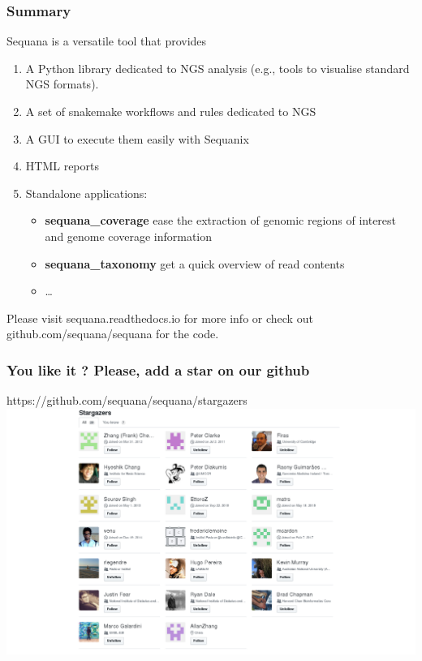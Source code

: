 \documentclass{beamer}
\begin{document}
\begin{frame}
 \frametitle{Summary}
Sequana is a versatile tool that provides

\begin{enumerate}
 \item A Python library dedicated to NGS analysis (e.g., tools to visualise 
standard NGS formats).
\item A set of snakemake workflows and rules dedicated to NGS 
 \item A GUI to execute them easily with Sequanix
 \item HTML reports
 \item Standalone applications:
 \begin{itemize}
    \item \textbf{sequana\_coverage} ease the extraction of genomic regions of interest and genome coverage information
    \item \textbf{sequana\_taxonomy} get a quick overview of read contents
    \item \dots
 \end{itemize}
\end{enumerate}

\begin{alertblock}{}
Please visit sequana.readthedocs.io for more info or check out
github.com/sequana/sequana  for the code.
\end{alertblock}
\end{frame}



\begin{frame}
\frametitle{You like it ? Please, add a star on our github}
    https://github.com/sequana/sequana/stargazers
    \centering
    \includegraphics[scale=0.28]{images/stargazers.png}\\
\end{frame}
\end{document}
